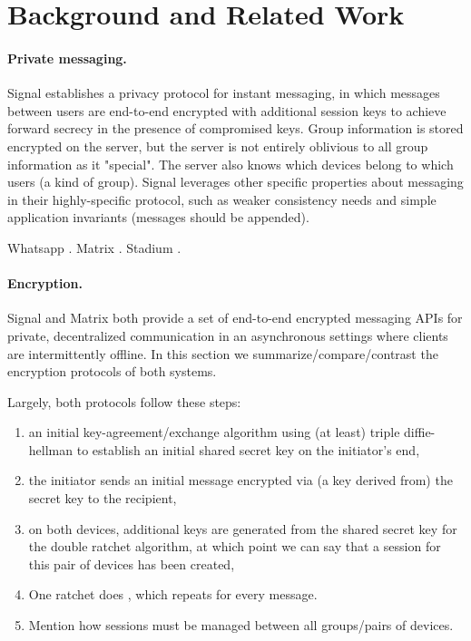 \section{Background and Related Work}

\paragraph{Private messaging.}
Signal \cite{signal} establishes a privacy protocol for instant messaging, in which messages between users are end-to-end encrypted with additional session keys to achieve forward secrecy in the presence of compromised keys. Group information is stored encrypted on the server, but the server is not entirely oblivious to all group information as it "special". The server also knows which devices belong to which users (a kind of group). Signal leverages other specific properties about messaging in their highly-specific protocol, such as weaker consistency needs and simple application invariants (messages should be appended).

Whatsapp \cite{whatsapp}.
Matrix \cite{matrix}.
Stadium \cite{stadium}.

\paragraph{Encryption.}
Signal \cite{signal} and Matrix \cite{matrix} both provide a set of end-to-end encrypted messaging APIs for private, decentralized communication in an asynchronous settings where 
clients are intermittently offline.  In this section we summarize/compare/contrast the encryption protocols of both systems.

Largely, both protocols follow these steps: 
\begin{enumerate}
\item
an initial key-agreement/exchange algorithm using (at least)
triple diffie-hellman to establish an initial shared secret 
key on the initiator's end, 
\item the initiator sends an initial message encrypted via
(a key derived from) the secret key to the recipient,
\item on both devices, additional keys are generated from 
the shared secret key for the double ratchet algorithm, at 
which point we can say that a session for this pair of 
devices has been created,
\item One ratchet does , which repeats for every message.
\item Mention how sessions must be managed between all
groups/pairs of devices.
\end{enumerate}

